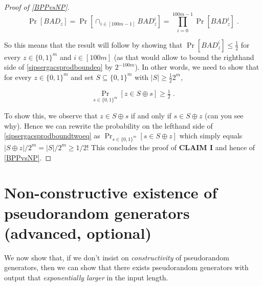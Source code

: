 \begin{proof}[Proof of \cref{BPPvsNP}]
\[\Pr[ \ensuremath{\mathit{BAD}}_z ] = \Pr[ \cap_{i\in [100m-1]} \ensuremath{\mathit{BAD}}_z^i ] = \prod_{i=0}^{100m-1} \Pr[\ensuremath{\mathit{BAD}}_z^i]  \label{sipsergacsprodboundeq}\;.\]

So this means that the result will follow by showing that
\(\Pr[ \ensuremath{\mathit{BAD}}_z^i ] \leq \tfrac{1}{2}\) for every
\(z\in \{0,1\}^m\) and \(i\in [100m]\) (as that would allow to bound the
righthand side of \eqref{sipsergacsprodboundeq} by \(2^{-100m}\)). In
other words, we need to show that for every \(z\in \{0,1\}^m\) and set
\(S \subseteq \{0,1\}^m\) with \(|S| \geq \tfrac{1}{2} 2^m\),

\[\Pr_{s \in \{0,1\}^m}[ z \in S \oplus s ] \geq \tfrac{1}{2}\; \label{sipsergacsprodboundtwoeq}.\]

To show this, we observe that \(z \in S \oplus s\) if and only if
\(s \in S \oplus z\) (can you see why). Hence we can rewrite the
probability on the lefthand side of \eqref{sipsergacsprodboundtwoeq} as
\(\Pr_{s\in \{0,1\}^m}[ s\in S \oplus z]\) which simply equals
\(|S \oplus z|/2^m = |S|/2^m \geq 1/2\)! This concludes the proof of
\textbf{CLAIM I} and hence of \cref{BPPvsNP}.

\end{proof}

\section{Non-constructive existence of pseudorandom generators
(advanced, optional)}\label{Non-constructive-existenc}

We now show that, if we don't insist on \emph{constructivity} of
pseudorandom generators, then we can show that there exists pseudorandom
generators with output that \emph{exponentially larger} in the input
length.

\hypertarget{prgexist}{}

